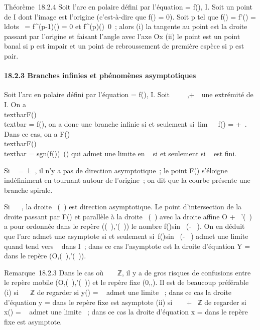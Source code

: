 Théorème~18.2.4 Soit \Gamma l'arc en polaire défini par l'équation \rho = f(\theta),
\theta \in I. Soit \theta un point de I dont l'image est l'origine (c'est-à-dire que
f(\theta) = 0). Soit p tel que f(\theta) = f'(\theta) =
\\ldots~ =
f^(p-1)(\theta) = 0 et
f^(p)(\theta)\neq~0~; alors (i) la tangente
au point \theta est la droite passant par l'origine et faisant l'angle \theta avec
l'axe Ox (ii) le point est un point banal si p est impair et un point de
rebroussement de première espèce si p est pair.

\paragraph{18.2.3 Branches infinies et phénomènes asymptotiques}

Soit \Gamma l'arc en polaire défini par l'équation \rho = f(\theta), \theta \in I. Soit \alpha~ \in
{}~ \cup\-\infty~,+\infty~\ une extrémité de I. On a
\\textbar{}F(\theta)\\textbar{} =
\textbar{}f(\theta)\textbar{}, on a donc une branche infinie si et seulement
si~lim\theta\rightarrow~\alpha~~\textbar{}f(\theta)\textbar{} =
+\infty~. Dans ce cas, on a  F(\theta) \over
\\textbar{}F(\theta)\\textbar{}
= sgn(f(\theta))\vecu~(\theta) qui
admet une limite en \alpha~ si et seulement si \alpha~ est fini.

Si \alpha~ = ±\infty~, il n'y a pas de direction asymptotique~; le point F(\theta)
s'éloigne indéfiniment en tournant autour de l'origine~; on dit que la
courbe présente une branche spirale.

Si \alpha~ \in {}~, la droite ~\vecu(\alpha~) est direction
asymptotique. Le point d'intersection de la droite passant par F(\theta) et
parallèle à la droite ~\vecu(\alpha~) avec la droite affine
O + ~\vecu'(\alpha~) a pour ordonnée dans le repère
(\vecu(\alpha~),\vecu'(\alpha~)) le nombre
f(\theta)sin~ (\theta - \alpha~). On en déduit que l'arc admet
une asymptote si et seulement si~f(\theta)sin~ (\theta -
\alpha~) admet une limite \ell quand \theta tend vers \alpha~ dans I~; dans ce cas
l'asymptote est la droite d'équation Y = \ell dans le repère
(O,\vecu(\alpha~),\vecu'(\alpha~)).

Remarque~18.2.3 Dans le cas où \alpha~ \in \pi~  ℤ, il y
a de gros risques de confusions entre le repère mobile
(O,\vecu(\alpha~),\vecu'(\alpha~)) et le
repère fixe (0,\vec\imath,). Il
est de beaucoup préférable (i) si \alpha~ \in \pi~ℤ de regarder si y(\theta) =
\rhosin~ \theta admet une limite \ell~; dans ce cas la
droite d'équation y = \ell dans le repère fixe est asymptote (ii) si \alpha~ \in
\pi~  + \pi~ℤ de regarder si x(\theta) =
\rhocos~ \theta admet une limite \ell~; dans ce cas la
droite d'équation x = \ell dans le repère fixe est asymptote.

